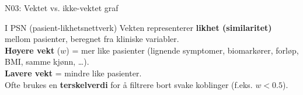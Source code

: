 \documentclass[aspectratio=169, 10pt]{beamer}
\begin{document}
\begin{frame}{N03: Vektet vs. ikke-vektet graf}
    \vspace{3mm}
    
    \begin{block}{I PSN (pasient-likhetsnettverk)}
        \footnotesize
        Vekten representerer \textbf{likhet (similaritet)} mellom pasienter, beregnet fra kliniske variabler.\\[2pt]
        \textbf{Høyere vekt} ($w$) = mer like pasienter (lignende symptomer, biomarkører, forløp, BMI, samme kjønn, \ldots).\\
        \textbf{Lavere vekt} = mindre like pasienter.\\
        Ofte brukes en \textbf{terskelverdi} for å filtrere bort svake koblinger (f.eks. $w < 0.5$).
    \end{block}
    
\end{frame}
\end{document}
